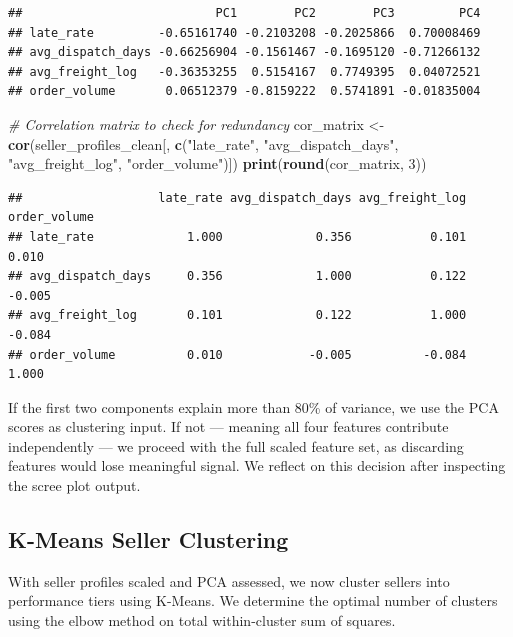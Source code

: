 \documentclass[
]{article}
\newenvironment{Shaded}{\begin{snugshade}}{\end{snugshade}}
\newcommand{\CommentTok}[1]{\textcolor[rgb]{0.56,0.35,0.01}{\textit{#1}}}
\newcommand{\DecValTok}[1]{\textcolor[rgb]{0.00,0.00,0.81}{#1}}
\newcommand{\FunctionTok}[1]{\textcolor[rgb]{0.13,0.29,0.53}{\textbf{#1}}}
\newcommand{\NormalTok}[1]{#1}
\newcommand{\OtherTok}[1]{\textcolor[rgb]{0.56,0.35,0.01}{#1}}
\newcommand{\StringTok}[1]{\textcolor[rgb]{0.31,0.60,0.02}{#1}}
\begin{document}
\begin{verbatim}
##                           PC1        PC2        PC3         PC4
## late_rate         -0.65161740 -0.2103208 -0.2025866  0.70008469
## avg_dispatch_days -0.66256904 -0.1561467 -0.1695120 -0.71266132
## avg_freight_log   -0.36353255  0.5154167  0.7749395  0.04072521
## order_volume       0.06512379 -0.8159222  0.5741891 -0.01835004
\end{verbatim}

\begin{Shaded}
\begin{Highlighting}[]
\CommentTok{\# Correlation matrix to check for redundancy}
\NormalTok{cor\_matrix }\OtherTok{\textless{}{-}} \FunctionTok{cor}\NormalTok{(seller\_profiles\_clean[, }\FunctionTok{c}\NormalTok{(}\StringTok{"late\_rate"}\NormalTok{, }\StringTok{"avg\_dispatch\_days"}\NormalTok{,}
                                              \StringTok{"avg\_freight\_log"}\NormalTok{, }\StringTok{"order\_volume"}\NormalTok{)])}
\FunctionTok{print}\NormalTok{(}\FunctionTok{round}\NormalTok{(cor\_matrix, }\DecValTok{3}\NormalTok{))}
\end{Highlighting}
\end{Shaded}

\begin{verbatim}
##                   late_rate avg_dispatch_days avg_freight_log order_volume
## late_rate             1.000             0.356           0.101        0.010
## avg_dispatch_days     0.356             1.000           0.122       -0.005
## avg_freight_log       0.101             0.122           1.000       -0.084
## order_volume          0.010            -0.005          -0.084        1.000
\end{verbatim}

If the first two components explain more than 80\% of variance, we use
the PCA scores as clustering input. If not --- meaning all four features
contribute independently --- we proceed with the full scaled feature
set, as discarding features would lose meaningful signal. We reflect on
this decision after inspecting the scree plot output.

\subsection{K-Means Seller Clustering}\label{k-means-seller-clustering}

With seller profiles scaled and PCA assessed, we now cluster sellers
into performance tiers using K-Means. We determine the optimal number of
clusters using the elbow method on total within-cluster sum of squares.
\end{document}
